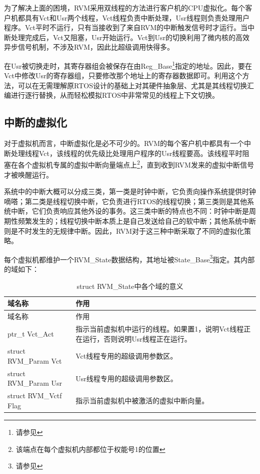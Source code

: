 \begin{enumerate}
  为了解决上面的困境，RVM采用双线程的方法进行客户机的CPU虚拟化。每个客户机都具有Vct和Usr两个线程，Vct线程负责中断处理，Usr线程则负责处理用户程序。Vct平时不运行，只有当接收到了来自RVM的中断触发信号时才运行。当中断处理完成后，Vct又阻塞，Usr开始运行。Vct到Usr的切换利用了微内核的高效异步信号机制，不涉及RVM，因此比超级调用快得多。

  在Usr被切换走时，其寄存器组会被保存在由Reg\_Base\footnote{请参见}指定的地址。因此，要在Vct中修改Usr的寄存器组，只要修改那个地址上的寄存器数据即可。利用这个方法，可以在无需理解原RTOS设计的基础上对其硬件抽象层、尤其是其线程切换汇编进行逐行替换，从而轻松模拟RTOS中非常常见的线程上下文切换。
\end{enumerate}

\subsection{中断的虚拟化}\label{subsec:2-2-4}

对于虚拟机而言，中断虚拟化是必不可少的。RVM的每个客户机中都具有一个中断处理线程Vct，该线程的优先级比处理用户程序的Usr线程要高。该线程平时阻塞在各个虚拟机专属的虚拟中断向量端点上\footnote{该端点在每个虚拟机内部都位于权能号1的位置}，直到收到RVM发来的虚拟中断信号才被唤醒运行。

系统中的中断大概可以分成三类，第一类是时钟中断，它负责向操作系统提供时钟嘀嗒；第二类是线程切换中断，它负责进行RTOS的线程切换；第三类则是其他系统中断，它们负责响应其他外设的事务。这三类中断的特点也不同：时钟中断是周期性频繁发生的；线程切换中断本质上是自己发送给自己的软中断；其他系统中断则是不时发生的无规律中断。因此，RVM对于这三种中断采取了不同的虚拟化策略。

每个虚拟机都维护一个RVM\_State数据结构，其地址被State\_Base\footnote{请参见}指定。其内部的域如下：

\begin{xltabular}{\textwidth}{@{}>{\hsize\raggedright\arraybackslash}X>{\hsize\raggedright\arraybackslash}X@{}}
\caption{struct RVM\_\allowbreak{}State中各个域的意义}\label{tab:2-3}\\
\toprule
域名称 & 作用\tabularnewline
\endfirsthead
\toprule
域名称 & 作用\tabularnewline
\midrule
\endhead
\bottomrule
\endlastfoot
ptr\_\allowbreak{}t Vct\_\allowbreak{}Act &
指示当前虚拟机中运行的线程。如果置1，说明Vct线程正在运行，否则说明Usr线程正在运行。\tabularnewline
struct RVM\_\allowbreak{}Param Vct & Vct线程专用的超级调用参数区。\tabularnewline
struct RVM\_\allowbreak{}Param Usr & Usr线程专用的超级调用参数区。\tabularnewline
struct RVM\_\allowbreak{}Vctf Flag &
指示当前虚拟机中被激活的虚拟中断向量。\tabularnewline
\end{xltabular}


